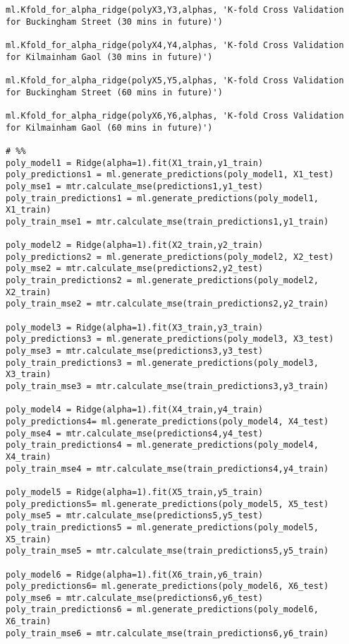 \begin{verbatim}
ml.Kfold_for_alpha_ridge(polyX3,Y3,alphas, 'K-fold Cross Validation for Buckingham Street (30 mins in future)')

ml.Kfold_for_alpha_ridge(polyX4,Y4,alphas, 'K-fold Cross Validation for Kilmainham Gaol (30 mins in future)')

ml.Kfold_for_alpha_ridge(polyX5,Y5,alphas, 'K-fold Cross Validation for Buckingham Street (60 mins in future)')

ml.Kfold_for_alpha_ridge(polyX6,Y6,alphas, 'K-fold Cross Validation for Kilmainham Gaol (60 mins in future)')

# %%
poly_model1 = Ridge(alpha=1).fit(X1_train,y1_train)
poly_predictions1 = ml.generate_predictions(poly_model1, X1_test)
poly_mse1 = mtr.calculate_mse(predictions1,y1_test)
poly_train_predictions1 = ml.generate_predictions(poly_model1, X1_train)
poly_train_mse1 = mtr.calculate_mse(train_predictions1,y1_train)

poly_model2 = Ridge(alpha=1).fit(X2_train,y2_train)
poly_predictions2 = ml.generate_predictions(poly_model2, X2_test)
poly_mse2 = mtr.calculate_mse(predictions2,y2_test)
poly_train_predictions2 = ml.generate_predictions(poly_model2, X2_train)
poly_train_mse2 = mtr.calculate_mse(train_predictions2,y2_train)

poly_model3 = Ridge(alpha=1).fit(X3_train,y3_train)
poly_predictions3 = ml.generate_predictions(poly_model3, X3_test)
poly_mse3 = mtr.calculate_mse(predictions3,y3_test)
poly_train_predictions3 = ml.generate_predictions(poly_model3, X3_train)
poly_train_mse3 = mtr.calculate_mse(train_predictions3,y3_train)

poly_model4 = Ridge(alpha=1).fit(X4_train,y4_train)
poly_predictions4= ml.generate_predictions(poly_model4, X4_test)
poly_mse4 = mtr.calculate_mse(predictions4,y4_test)
poly_train_predictions4 = ml.generate_predictions(poly_model4, X4_train)
poly_train_mse4 = mtr.calculate_mse(train_predictions4,y4_train)

poly_model5 = Ridge(alpha=1).fit(X5_train,y5_train)
poly_predictions5= ml.generate_predictions(poly_model5, X5_test)
poly_mse5 = mtr.calculate_mse(predictions5,y5_test)
poly_train_predictions5 = ml.generate_predictions(poly_model5, X5_train)
poly_train_mse5 = mtr.calculate_mse(train_predictions5,y5_train)

poly_model6 = Ridge(alpha=1).fit(X6_train,y6_train)
poly_predictions6= ml.generate_predictions(poly_model6, X6_test)
poly_mse6 = mtr.calculate_mse(predictions6,y6_test)
poly_train_predictions6 = ml.generate_predictions(poly_model6, X6_train)
poly_train_mse6 = mtr.calculate_mse(train_predictions6,y6_train)


\end{verbatim}
